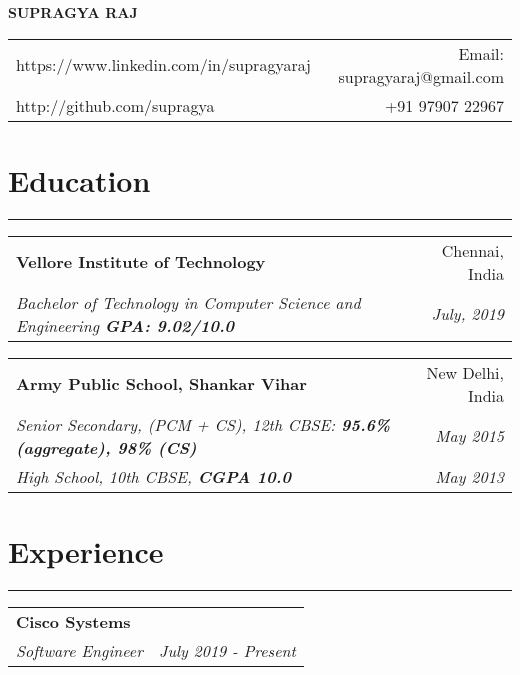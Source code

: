 \documentclass[a4paper,6pt]{article}
\begin{document}
\begin{center}
\Large \textbf{SUPRAGYA RAJ}


\end{center}
\begin{tabularx}{\textwidth}{X r}
	https://www.linkedin.com/in/supragyaraj & Email: supragyaraj@gmail.com \\
	http://github.com/supragya & +91 97907 22967 
\end{tabularx}


\section*{Education}
\vspace{-8px}
\hrule
\vspace{4px}
\hspace{5px}
\begin{tabularx}{\textwidth}{X r}
	\textbf{Vellore Institute of Technology} & Chennai, India \\
	\textit{\small Bachelor of Technology in Computer Science and Engineering \textcolor{mygray}{\textbf{GPA: 9.02/10.0}}} & \textit{July, 2019} 
\end{tabularx}

\hspace{5px}
\begin{tabularx}{\textwidth}{X r}
	\textbf{Army Public School, Shankar Vihar} & New Delhi, India \\
	\textit{\small Senior Secondary, (PCM + CS), 12th CBSE:  \textcolor{mygray}{\textbf{95.6\% (aggregate), 98\% (CS)}}} & \textit{May 2015} \\
	\textit{\small High School, 10th CBSE, \textcolor{mygray}{\textbf{CGPA 10.0}}} & \textit{May 2013}
\end{tabularx}

\vspace{-9px}
\section*{Experience}
\vspace{-8px}
\hrule

\vspace{4px}
\hspace{5px}
\begin{tabularx}{\textwidth}{X r}
	\large{\textbf{Cisco Systems}} & \\
	\textit{\small Software Engineer} & \textit{July 2019 - Present} \\
\end{tabularx}
\end{document}
